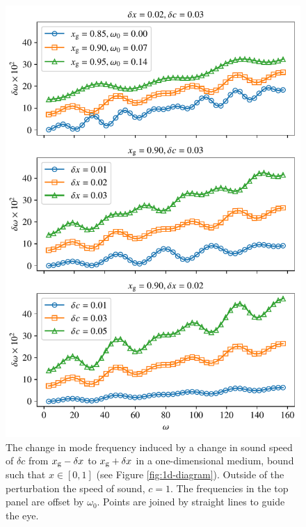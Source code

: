\begin{figure}
    \centering
    \includegraphics{figures/glitch-1d-example-results.pdf}
    \caption[The change in mode frequency induced by a rapid change in sound speed for the 1D example.]{The change in mode frequency induced by a change in sound speed of \(\delta c\) from \(x_{{\mathrm{g}}} - \delta x\) to \(x_{{\mathrm{g}}} + \delta x\) in a one-dimensional medium, bound such that \(x \in [0, 1]\) (see Figure \ref{fig:1d-diagram}). Outside of the perturbation the speed of sound, \(c=1\).
    The frequencies in the top panel are offset by \(\omega_0\).
    Points are joined by straight lines to guide the eye.
    }
    \label{fig:1d-results}
\end{figure}

